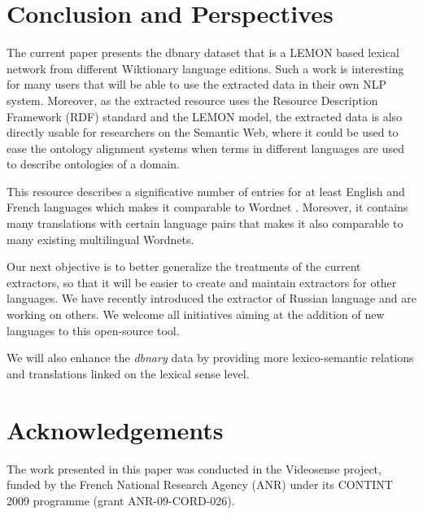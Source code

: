 \documentclass[sw]{iosart2c}
\begin{document}
\section{Conclusion and Perspectives}

The current paper presents the dbnary dataset that is a LEMON based lexical network from different Wiktionary language editions. Such a work is interesting for many users that will be able to use the extracted data in their own NLP system. Moreover, as the extracted resource uses the Resource Description Framework (RDF) standard and the LEMON model, the extracted data is also directly usable for researchers on the Semantic Web, where it could be used to ease the ontology alignment systems when terms in different languages are used to describe ontologies of a domain.

This resource describes a significative number of entries for at least English and French languages which makes it comparable to Wordnet \cite{wordnet-fellbaum}. Moreover, it contains many translations with certain language pairs that makes it also comparable to many existing multilingual Wordnets.

Our next objective is to better generalize the treatments of the current extractors, so that it will be easier to create and maintain extractors for other languages. We have recently introduced the extractor of Russian language and are working on others. We welcome all initiatives aiming at the addition of new languages to this open-source tool. 

We will also enhance the \textit{dbnary} data by providing more lexico-semantic relations and translations linked on the lexical sense level.

\section{Acknowledgements}

The work presented in this paper was conducted in the Videosense project, funded by the French National Research Agency (ANR) under its CONTINT 2009 programme (grant ANR-09-CORD-026).
\end{document}
